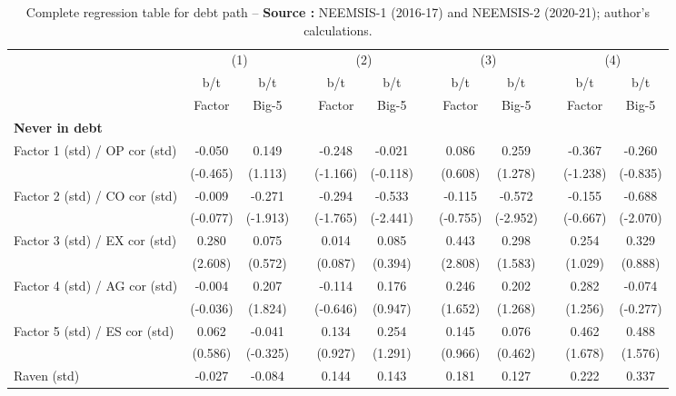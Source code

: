 {\tiny\tabcolsep=0pt
    \begin{longtable}{@{\extracolsep{\fill}}lccccccccccc}
	\caption{Complete regression table for debt path --  \textbf{Source :} NEEMSIS-1 (2016-17) and NEEMSIS-2 (2020-21); author's calculations.} \\
    \toprule
      & \multicolumn{2}{c}{(1)} &   & \multicolumn{2}{c}{(2)} &   & \multicolumn{2}{c}{(3)} &   & \multicolumn{2}{c}{(4)} \\
\cmidrule{2-3}\cmidrule{5-6}\cmidrule{8-9}\cmidrule{11-12}      & b/t & b/t &   & b/t & b/t &   & b/t & b/t &   & b/t & b/t \\
      & Factor & Big-5 &   & Factor & Big-5 &   & Factor & Big-5 &   & Factor & Big-5 \\
    \midrule
    \textbf{Never in debt} &       &       &       &       &       &       &       &       &       &       &  \\
    Factor 1 (std) / OP cor (std) & -0.050 & 0.149 &       & -0.248 & -0.021 &       & 0.086 & 0.259 &       & -0.367 & -0.260 \\
          & (-0.465) & (1.113) &       & (-1.166) & (-0.118) &       & (0.608) & (1.278) &       & (-1.238) & (-0.835) \\
    Factor 2 (std) / CO cor (std) & -0.009 & -0.271 &       & -0.294 & -0.533 &       & -0.115 & -0.572 &       & -0.155 & -0.688 \\
          & (-0.077) & (-1.913) &       & (-1.765) & (-2.441) &       & (-0.755) & (-2.952) &       & (-0.667) & (-2.070) \\
    Factor 3 (std) / EX cor (std) & 0.280 & 0.075 &       & 0.014 & 0.085 &       & 0.443 & 0.298 &       & 0.254 & 0.329 \\
          & (2.608) & (0.572) &       & (0.087) & (0.394) &       & (2.808) & (1.583) &       & (1.029) & (0.888) \\
    Factor 4 (std) / AG cor (std) & -0.004 & 0.207 &       & -0.114 & 0.176 &       & 0.246 & 0.202 &       & 0.282 & -0.074 \\
          & (-0.036) & (1.824) &       & (-0.646) & (0.947) &       & (1.652) & (1.268) &       & (1.256) & (-0.277) \\
    Factor 5 (std) / ES cor (std) & 0.062 & -0.041 &       & 0.134 & 0.254 &       & 0.145 & 0.076 &       & 0.462 & 0.488 \\
          & (0.586) & (-0.325) &       & (0.927) & (1.291) &       & (0.966) & (0.462) &       & (1.678) & (1.576) \\
    Raven (std) & -0.027 & -0.084 &       & 0.144 & 0.143 &       & 0.181 & 0.127 &       & 0.222 & 0.337 \\

\end{longtable}}

